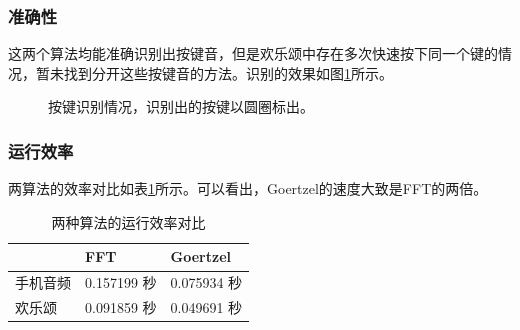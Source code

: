 \documentclass{article}
\begin{document}
\subsubsection{准确性}
这两个算法均能准确识别出按键音，但是欢乐颂中存在多次快速按下同一个键的情况，暂未找到分开这些按键音的方法。识别的效果如图\ref{fig:1-acc}所示。
\begin{figure}[htbp]
\centering
{}
\caption{按键识别情况，识别出的按键以圆圈标出。}
\label{fig:1-acc}
\end{figure}
\subsubsection{运行效率}
两算法的效率对比如表\ref{tab:1-eff}所示。可以看出，Goertzel的速度大致是FFT的两倍。
\begin{table}[htbp]
\centering
\begin{tabular}{|l|l|l|} \hline
    & FFT & Goertzel \\ \hline
    手机音频 & 0.157199 秒 & 0.075934 秒 \\ \hline
    欢乐颂 & 0.091859 秒 & 0.049691 秒 \\ \hline
\end{tabular}
\caption{两种算法的运行效率对比}
\label{tab:1-eff}
\end{table}
\end{document}

